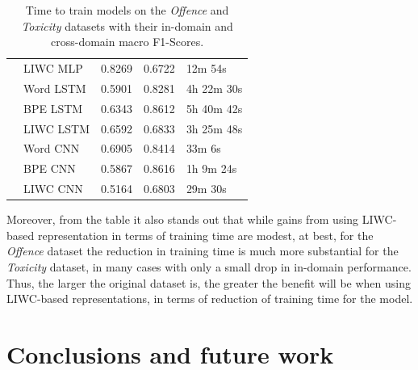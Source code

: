 \begin{table}[h]
\begin{tabular}{c|llll}
                                           & LIWC MLP  & 0.8269           & 0.6722            & 12m 54s       \\
                                           & Word LSTM & 0.5901           & 0.8281            & 4h 22m 30s    \\
                                           & BPE LSTM  & 0.6343           & 0.8612            & 5h 40m 42s    \\
                                           & LIWC LSTM & 0.6592           & 0.6833            & 3h 25m 48s    \\
                                           & Word CNN  & 0.6905           & 0.8414            & 33m 6s        \\
                                           & BPE CNN   & 0.5867           & 0.8616            & 1h 9m 24s     \\
                                           & LIWC CNN  & 0.5164           & 0.6803            & 29m 30s      
\end{tabular}%
\caption{Time to train models on the \textit{Offence} and \textit{Toxicity} datasets with their in-domain and cross-domain macro F1-Scores.}
\label{tab:time_spent_davidson_wulczyn}
\end{table}

Moreover, from the table it also stands out that while gains from using LIWC-based representation in terms of training time are modest, at best, for the \textit{Offence} dataset the reduction in training time is much more substantial for the \textit{Toxicity} dataset, in many cases with only a small drop in in-domain performance. Thus, the larger the original dataset is, the greater the benefit will be when using LIWC-based representations, in terms of reduction of training time for the model.

\section{Conclusions and future work}

